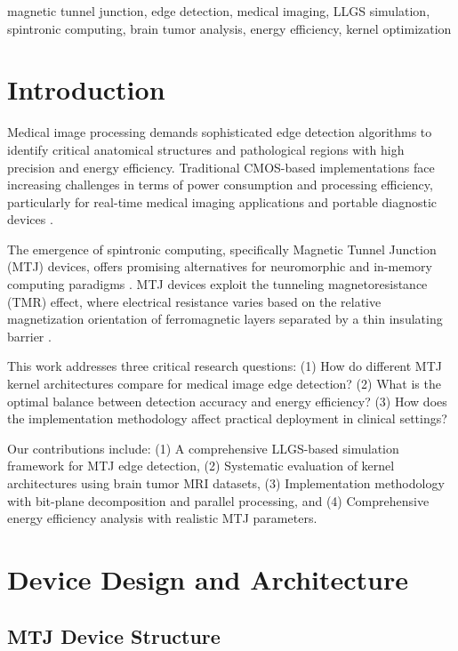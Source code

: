 \documentclass[conference]{IEEEtran}
\begin{document}
\begin{IEEEkeywords}
magnetic tunnel junction, edge detection, medical imaging, LLGS simulation, spintronic computing, brain tumor analysis, energy efficiency, kernel optimization
\end{IEEEkeywords}

\section{Introduction}

Medical image processing demands sophisticated edge detection algorithms to identify critical anatomical structures and pathological regions with high precision and energy efficiency. Traditional CMOS-based implementations face increasing challenges in terms of power consumption and processing efficiency, particularly for real-time medical imaging applications and portable diagnostic devices \cite{b1}. 

The emergence of spintronic computing, specifically Magnetic Tunnel Junction (MTJ) devices, offers promising alternatives for neuromorphic and in-memory computing paradigms \cite{b2}. MTJ devices exploit the tunneling magnetoresistance (TMR) effect, where electrical resistance varies based on the relative magnetization orientation of ferromagnetic layers separated by a thin insulating barrier \cite{b3}.

This work addresses three critical research questions: (1) How do different MTJ kernel architectures compare for medical image edge detection? (2) What is the optimal balance between detection accuracy and energy efficiency? (3) How does the implementation methodology affect practical deployment in clinical settings?

Our contributions include: (1) A comprehensive LLGS-based simulation framework for MTJ edge detection, (2) Systematic evaluation of kernel architectures using brain tumor MRI datasets, (3) Implementation methodology with bit-plane decomposition and parallel processing, and (4) Comprehensive energy efficiency analysis with realistic MTJ parameters.

\section{Device Design and Architecture}

\subsection{MTJ Device Structure}
\end{document}

